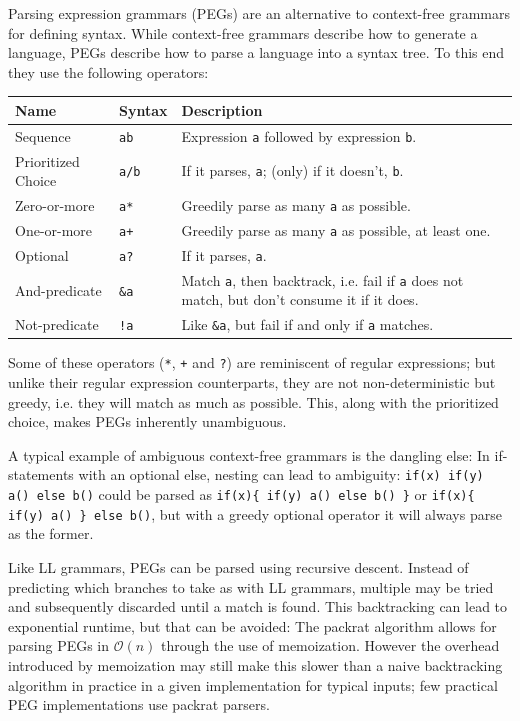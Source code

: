 			Parsing expression grammars (PEGs) are an alternative to context-free grammars for defining syntax\cite{peg}. While context-free grammars describe how to generate a language, PEGs describe how to parse a language into a syntax tree. To this end they use the following operators:
			
			\begin{center}
			\begin{tabular}{ l l p{10cm} }
			\toprule
			Name               & Syntax          & Description \\
			\midrule
			Sequence           & \lstinline$ab$  & Expression \lstinline$a$ followed by expression \lstinline$b$. \\
			Prioritized Choice & \lstinline$a/b$ & If it parses, \lstinline$a$; (only) if it doesn't, \lstinline$b$. \\
			Zero-or-more       & \lstinline$a*$  & Greedily parse as many \lstinline$a$ as possible. \\
			One-or-more        & \lstinline$a+$  & Greedily parse as many \lstinline$a$ as possible, at least one. \\
			Optional           & \lstinline$a?$  & If it parses, \lstinline$a$. \\
			And-predicate      & \lstinline$&a$  & Match \lstinline$a$, then backtrack, i.e. fail if \lstinline$a$ does not match, but don't consume it if it does. \\
			Not-predicate      & \lstinline$!a$  & Like \lstinline$&a$, but fail if and only if \lstinline$a$ matches. \\
			\bottomrule
			\end{tabular}
			\end{center}
			
			Some of these operators (\lstinline$*$, \lstinline$+$ and \lstinline$?$) are reminiscent of regular expressions; but unlike their regular expression counterparts, they are not non-deterministic but greedy, i.e. they will match as much as possible. This, along with the prioritized choice, makes PEGs inherently unambiguous.
			
			A typical example of ambiguous context-free grammars is the dangling else: In if-statements with an optional else, nesting can lead to ambiguity: \lstinline$if(x) if(y) a() else b()$ could be parsed as \lstinline$if(x){ if(y) a() else b() }$ or \lstinline$if(x){ if(y) a() } else b()$, but with a greedy optional operator it will always parse as the former.
			
			Like LL grammars, PEGs can be parsed using recursive descent. Instead of predicting which branches to take as with LL grammars, multiple may be tried and subsequently discarded until a match is found. This backtracking can lead to exponential runtime, but that can be avoided: The packrat algorithm allows for parsing PEGs in $\mathcal{O}(n)$ through the use of memoization\cite{packrat}. However the overhead introduced by memoization may still make this slower than a naive backtracking algorithm in practice in a given implementation for typical inputs; few practical PEG implementations use packrat parsers.
			
